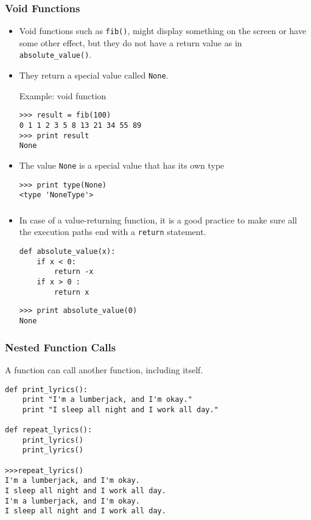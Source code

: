 \documentclass{beamer}
\begin{document}
\begin{frame}[fragile]
\frametitle{Void Functions }

\begin{itemize} 
\item Void functions such as \verb!fib()!, might display something on the screen or have some
other effect, but they do not have a return value as in \verb!absolute_value()!.  
\item They return a \alert{special value} called {\tt None}.
\begin{block}{Example: void function}
\small
\begin{verbatim}
>>> result = fib(100)
0 1 1 2 3 5 8 13 21 34 55 89
>>> print result
None
\end{verbatim}
\end{block}
\item The value {\tt None} is a special value that has its own type

\small
\begin{verbatim}
>>> print type(None)
<type 'NoneType'>
\end{verbatim}
\normalsize
\end{itemize}
\end{frame}
\begin{frame}[fragile]
\frametitle{}
\begin{itemize}
\item  In case of a value-returning function, it is a good practice to make sure all the  execution paths end with a \texttt{return} statement.
\begin{block}{}
\small
\begin{verbatim}
def absolute_value(x):
    if x < 0:
        return -x
    if x > 0 :
        return x
\end{verbatim}
\small
\begin{verbatim}
>>> print absolute_value(0)
None
\end{verbatim}
\end{block}
\end{itemize}
\end{frame}

\begin{frame}[fragile]
\frametitle{Nested Function Calls}
A function can call  another function, including itself.
\begin{block}{}
\small
\begin{verbatim}
def print_lyrics():
    print "I'm a lumberjack, and I'm okay."
    print "I sleep all night and I work all day."

def repeat_lyrics():
    print_lyrics()
    print_lyrics()

>>>repeat_lyrics()
I'm a lumberjack, and I'm okay.
I sleep all night and I work all day.
I'm a lumberjack, and I'm okay.
I sleep all night and I work all day.
\end{verbatim}
\end{block}
\end{frame}
\end{document}
